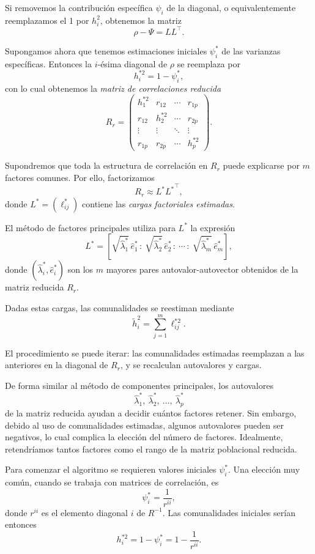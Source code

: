\documentclass[
]{book}
\begin{document}
Si removemos la contribución específica \(\psi_i\) de la diagonal, o
equivalentemente reemplazamos el 1 por \(h_i^2\), obtenemos la matriz
\[
\rho - \Psi = LL^\top.
\]

Supongamos ahora que tenemos estimaciones iniciales \(\psi_i^*\) de las varianzas
específicas. Entonces la \(i\)-ésima diagonal de \(\rho\) se reemplaza por
\[
h_i^{*2} = 1 - \psi_i^*,
\]
con lo cual obtenemos la \emph{matriz de correlaciones reducida}
\[
R_r =
\begin{pmatrix}
h_1^{*2} & r_{12} & \cdots & r_{1p} \\
r_{12} & h_2^{*2} & \cdots & r_{2p} \\
\vdots & \vdots & \ddots & \vdots \\
r_{1p} & r_{2p} & \cdots & h_p^{*2}
\end{pmatrix}.
\]

Supondremos que toda la estructura de correlación en \(R_r\) puede explicarse por
\(m\) factores comunes. Por ello, factorizamos
\[
R_r \approx L^* {L^*}^\top,
\]
donde \(L^* = (\ell_{ij}^*)\) contiene las \emph{cargas factoriales estimadas}.

El método de factores principales utiliza para \(L^*\) la expresión
\[
L^* = 
\left[
\sqrt{\hat{\lambda}_1^*}\, \hat{e}_1^* \,:\:
\sqrt{\hat{\lambda}_2^*}\, \hat{e}_2^* \,:\:
\cdots \,:\:
\sqrt{\hat{\lambda}_m^*}\, \hat{e}_m^*
\right],
\]
donde \((\hat{\lambda}_i^*, \hat{e}_i^*)\) son los \(m\) mayores pares
autovalor-autovector obtenidos de la matriz reducida \(R_r\).

Dadas estas cargas, las comunalidades se reestiman mediante
\[
\tilde{h}_i^2 = \sum_{j=1}^m \ell_{ij}^{*2}. 
\]

El procedimiento se puede iterar: las comunalidades estimadas reemplazan a las
anteriores en la diagonal de \(R_r\), y se recalculan autovalores y cargas.

De forma similar al método de componentes principales, los autovalores
\[
\hat{\lambda}_1^*,\ \hat{\lambda}_2^*,\ \ldots,\ \hat{\lambda}_p^*
\]
de la matriz reducida ayudan a decidir cuántos factores retener. Sin embargo,
debido al uso de comunalidades estimadas, algunos autovalores pueden ser
negativos, lo cual complica la elección del número de factores. Idealmente,
retendríamos tantos factores como el rango de la matriz poblacional reducida.

Para comenzar el algoritmo se requieren valores iniciales \(\psi_i^*\). Una
elección muy común, cuando se trabaja con matrices de correlación, es
\[
\psi_i^* = \frac{1}{r^{ii}},
\]
donde \(r^{ii}\) es el elemento diagonal \(i\) de \(R^{-1}\). Las comunalidades
iniciales serían entonces
\[
h_i^{*2} = 1 - \psi_i^* = 1 - \frac{1}{r^{ii}}. 
\]
\end{document}

